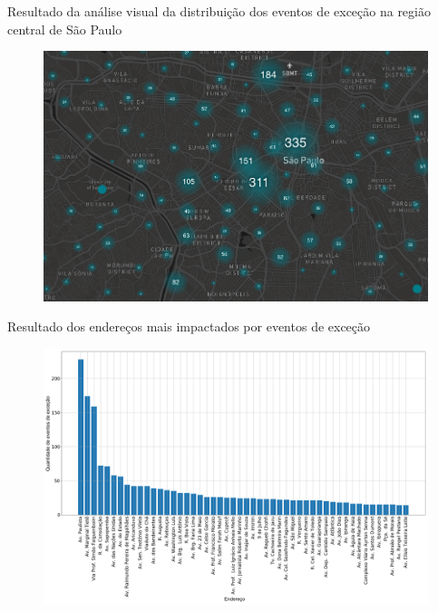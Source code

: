 \documentclass{beamer}
\begin{document}
\begin{frame}{Resultado da análise visual da distribuição dos eventos de exceção na região central de São Paulo}
\begin{figure}[!htb]%
	\centering
		\includegraphics[width=1\linewidth]{exception_events_sp.png}
	\label{fig:pizza_bus}
\end{figure}
\end{frame}
\begin{frame}{Resultado dos endereços mais impactados por eventos de exceção}
    \begin{figure}[!htb]%
	\centering
		\includegraphics[width=1\linewidth]{address_analysis_pt.png}
	\label{fig:pizza_bus}
\end{figure}
\end{frame}
\end{document}

